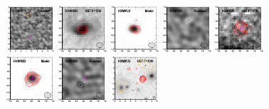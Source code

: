 \documentclass[iop]{emulateapj}
\begin{document}
\begin{figure}[!tbp]
\begin{centering}
\includegraphics[width=0.162\textwidth]{HXMM11_residual_bestfit.pdf}
\includegraphics[width=0.162\textwidth]{HXMM23_optical_bestfit.pdf}
\includegraphics[width=0.162\textwidth]{HXMM23_model_bestfit.pdf}
\includegraphics[width=0.162\textwidth]{HXMM23_residual_bestfit.pdf}
\includegraphics[width=0.162\textwidth]{HXMM22_optical_bestfit.pdf}
\includegraphics[width=0.162\textwidth]{HXMM22_model_bestfit.pdf}
\includegraphics[width=0.162\textwidth]{HXMM22_residual_bestfit.pdf}
\includegraphics[width=0.162\textwidth]{HXMM05_optical_bestfit.pdf}

\end{centering}
\end{figure}
\end{document}
